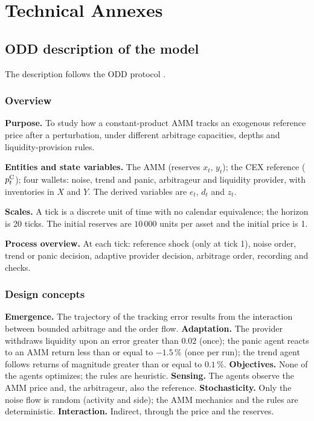 \chapter{Technical Annexes}
\label{cap:anexos}

\section{ODD description of the model}
\label{sec:odd}

The description follows the ODD protocol \cite{grimm2020odd}.

\subsection*{Overview}

\textbf{Purpose.} To study how a constant-product AMM tracks an exogenous reference price after a perturbation, under different arbitrage capacities, depths and liquidity-provision rules.

\textbf{Entities and state variables.} The AMM (reserves $x_t$, $y_t$); the CEX reference ($p^{\mathrm{C}}_t$); four wallets: noise, trend and panic, arbitrageur and liquidity provider, with inventories in $X$ and $Y$. The derived variables are $e_t$, $d_t$ and $z_t$.

\textbf{Scales.} A tick is a discrete unit of time with no calendar equivalence; the horizon is 20 ticks. The initial reserves are $10\,000$ units per asset and the initial price is 1.

\textbf{Process overview.} At each tick: reference shock (only at tick 1), noise order, trend or panic decision, adaptive provider decision, arbitrage order, recording and checks.

\subsection*{Design concepts}

\textbf{Emergence.} The trajectory of the tracking error results from the interaction between bounded arbitrage and the order flow. \textbf{Adaptation.} The provider withdraws liquidity upon an error greater than $0.02$ (once); the panic agent reacts to an AMM return less than or equal to $-1.5\,\%$ (once per run); the trend agent follows returns of magnitude greater than or equal to $0.1\,\%$. \textbf{Objectives.} None of the agents optimizes; the rules are heuristic. \textbf{Sensing.} The agents observe the AMM price and, the arbitrageur, also the reference. \textbf{Stochasticity.} Only the noise flow is random (activity and side); the AMM mechanics and the rules are deterministic. \textbf{Interaction.} Indirect, through the price and the reserves.

